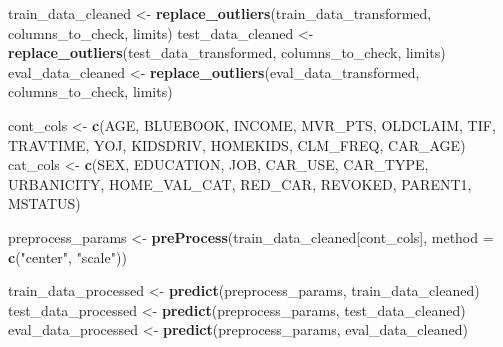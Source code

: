 \documentclass[
]{article}
\newenvironment{Shaded}{\begin{snugshade}}{\end{snugshade}}
\newcommand{\AttributeTok}[1]{\textcolor[rgb]{0.13,0.29,0.53}{#1}}
\newcommand{\FunctionTok}[1]{\textcolor[rgb]{0.13,0.29,0.53}{\textbf{#1}}}
\newcommand{\NormalTok}[1]{#1}
\newcommand{\OtherTok}[1]{\textcolor[rgb]{0.56,0.35,0.01}{#1}}
\newcommand{\StringTok}[1]{\textcolor[rgb]{0.31,0.60,0.02}{#1}}
\begin{document}
\begin{Shaded}
\begin{Highlighting}[]
\NormalTok{train\_data\_cleaned }\OtherTok{\textless{}{-}} \FunctionTok{replace\_outliers}\NormalTok{(train\_data\_transformed, columns\_to\_check, limits)}
\NormalTok{test\_data\_cleaned }\OtherTok{\textless{}{-}} \FunctionTok{replace\_outliers}\NormalTok{(test\_data\_transformed, columns\_to\_check, limits)}
\NormalTok{eval\_data\_cleaned }\OtherTok{\textless{}{-}} \FunctionTok{replace\_outliers}\NormalTok{(eval\_data\_transformed, columns\_to\_check, limits)}


\NormalTok{cont\_cols }\OtherTok{\textless{}{-}} \FunctionTok{c}\NormalTok{(}\StringTok{\textquotesingle{}AGE\textquotesingle{}}\NormalTok{, }\StringTok{\textquotesingle{}BLUEBOOK\textquotesingle{}}\NormalTok{, }\StringTok{\textquotesingle{}INCOME\textquotesingle{}}\NormalTok{, }\StringTok{\textquotesingle{}MVR\_PTS\textquotesingle{}}\NormalTok{, }\StringTok{\textquotesingle{}OLDCLAIM\textquotesingle{}}\NormalTok{, }\StringTok{\textquotesingle{}TIF\textquotesingle{}}\NormalTok{, }\StringTok{\textquotesingle{}TRAVTIME\textquotesingle{}}\NormalTok{, }\StringTok{\textquotesingle{}YOJ\textquotesingle{}}\NormalTok{, }\StringTok{\textquotesingle{}KIDSDRIV\textquotesingle{}}\NormalTok{, }\StringTok{\textquotesingle{}HOMEKIDS\textquotesingle{}}\NormalTok{, }\StringTok{\textquotesingle{}CLM\_FREQ\textquotesingle{}}\NormalTok{, }\StringTok{\textquotesingle{}CAR\_AGE\textquotesingle{}}\NormalTok{)}
\NormalTok{cat\_cols }\OtherTok{\textless{}{-}} \FunctionTok{c}\NormalTok{(}\StringTok{\textquotesingle{}SEX\textquotesingle{}}\NormalTok{, }\StringTok{\textquotesingle{}EDUCATION\textquotesingle{}}\NormalTok{, }\StringTok{\textquotesingle{}JOB\textquotesingle{}}\NormalTok{, }\StringTok{\textquotesingle{}CAR\_USE\textquotesingle{}}\NormalTok{, }\StringTok{\textquotesingle{}CAR\_TYPE\textquotesingle{}}\NormalTok{, }\StringTok{\textquotesingle{}URBANICITY\textquotesingle{}}\NormalTok{, }\StringTok{\textquotesingle{}HOME\_VAL\_CAT\textquotesingle{}}\NormalTok{, }\StringTok{\textquotesingle{}RED\_CAR\textquotesingle{}}\NormalTok{, }\StringTok{\textquotesingle{}REVOKED\textquotesingle{}}\NormalTok{, }\StringTok{\textquotesingle{}PARENT1\textquotesingle{}}\NormalTok{, }\StringTok{\textquotesingle{}MSTATUS\textquotesingle{}}\NormalTok{)  }

\NormalTok{preprocess\_params }\OtherTok{\textless{}{-}} \FunctionTok{preProcess}\NormalTok{(train\_data\_cleaned[cont\_cols], }\AttributeTok{method =} \FunctionTok{c}\NormalTok{(}\StringTok{"center"}\NormalTok{, }\StringTok{"scale"}\NormalTok{))}

\NormalTok{train\_data\_processed }\OtherTok{\textless{}{-}} \FunctionTok{predict}\NormalTok{(preprocess\_params, train\_data\_cleaned)}
\NormalTok{test\_data\_processed }\OtherTok{\textless{}{-}} \FunctionTok{predict}\NormalTok{(preprocess\_params, test\_data\_cleaned)}
\NormalTok{eval\_data\_processed }\OtherTok{\textless{}{-}} \FunctionTok{predict}\NormalTok{(preprocess\_params, eval\_data\_cleaned)}


\end{Highlighting}
\end{Shaded}
\end{document}
